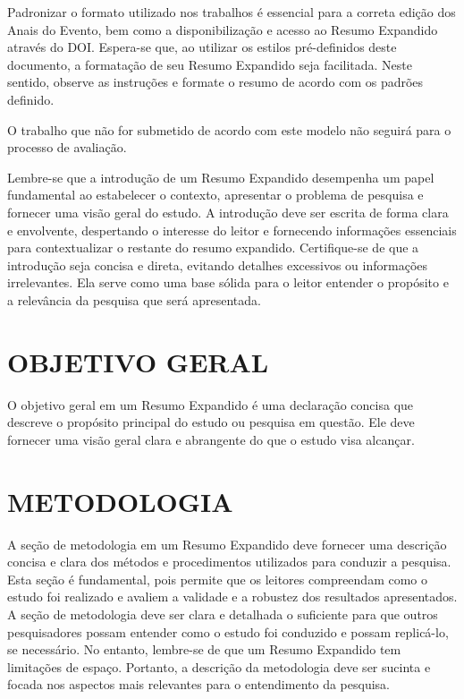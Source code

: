 \documentclass[a4paper,11pt]{article} %
\begin{document}
Padronizar o formato utilizado nos trabalhos é essencial para a correta edição dos Anais do Evento, bem como a disponibilização e acesso ao Resumo Expandido através do DOI. Espera-se que, ao utilizar os estilos pré-definidos deste documento, a formatação de seu Resumo Expandido seja facilitada. Neste sentido, observe as instruções e formate o resumo de acordo com os padrões definido. 

O trabalho que não for submetido de acordo com este modelo não seguirá para o processo de avaliação.

Lembre-se que a introdução de um Resumo Expandido desempenha um papel fundamental ao estabelecer o contexto, apresentar o problema de pesquisa e fornecer uma visão geral do estudo. A introdução deve ser escrita de forma clara e envolvente, despertando o interesse do leitor e fornecendo informações essenciais para contextualizar o restante do resumo expandido. Certifique-se de que a introdução seja concisa e direta, evitando detalhes excessivos ou informações irrelevantes. Ela serve como uma base sólida para o leitor entender o propósito e a relevância da pesquisa que será apresentada.


\section{OBJETIVO GERAL}

O objetivo geral em um Resumo Expandido é uma declaração concisa que descreve o propósito principal do estudo ou pesquisa em questão. Ele deve fornecer uma visão geral clara e abrangente do que o estudo visa alcançar. 

\section{METODOLOGIA}

A seção de metodologia em um Resumo Expandido deve fornecer uma descrição concisa e clara dos métodos e procedimentos utilizados para conduzir a pesquisa. Esta seção é fundamental, pois permite que os leitores compreendam como o estudo foi realizado e avaliem a validade e a robustez dos resultados apresentados. A seção de metodologia deve ser clara e detalhada o suficiente para que outros pesquisadores possam entender como o estudo foi conduzido e possam replicá-lo, se necessário. No entanto, lembre-se de que um Resumo Expandido tem limitações de espaço. Portanto, a descrição da metodologia deve ser sucinta e focada nos aspectos mais relevantes para o entendimento da pesquisa.
\end{document}
